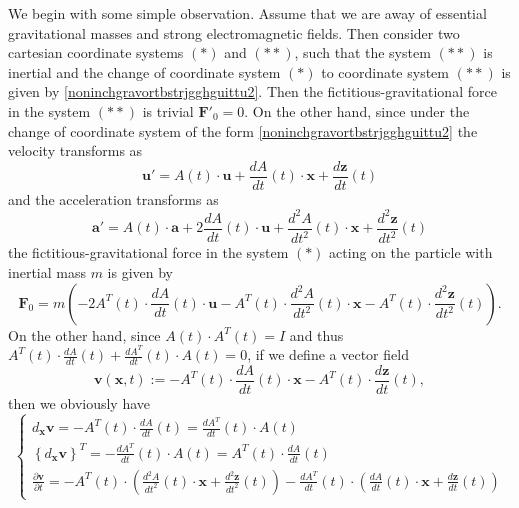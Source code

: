 \documentclass{article}
\theoremstyle{definition}
\theoremstyle{remark}
\renewcommand{\vec}[1]{\mathbf{#1}}
\newcommand{\er}{\eqref}
\newcommand{\er}{\eqref}
\begin{document}
 We begin with some simple observation. Assume that we are away of
essential gravitational masses and strong electromagnetic fields.
Then consider two cartesian coordinate systems $(*)$ and $(**)$,
such that the system $(**)$ is inertial and the change of coordinate
system $(*)$ to coordinate system $(**)$ is given by
\er{noninchgravortbstrjgghguittu2}. Then the
fictitious-gravitational force in the system $(**)$ is trivial $\vec
F'_0=0$. On the other hand, since under the change of coordinate
system of the form \er{noninchgravortbstrjgghguittu2} the velocity
transforms as
\begin{equation}\label{noninchgravortbstrjgghguittu2gjg}
\vec u'=A(t)\cdot\vec u+\frac{dA}{dt}(t)\cdot\vec x+\frac{d\vec
z}{dt}(t)
\end{equation}
and the acceleration
transforms as
\begin{equation}\label{noninchgravortbstrjgghguittu2gjgghhjhg}
\vec a'=A(t)\cdot\vec a+2\frac{dA}{dt}(t)\cdot\vec
u+\frac{d^2A}{dt^2}(t)\cdot\vec x+\frac{d^2\vec z}{dt^2}(t)
\end{equation}
the fictitious-gravitational force in the system $(*)$ acting on the
particle with inertial mass $m$ is given by
\begin{equation}\label{noninchgravortbstrjgghguittu2gjgghhjhghjhjgg}
\vec F_0=m\left(-2A^T(t)\cdot\frac{dA}{dt}(t)\cdot\vec
u-A^T(t)\cdot\frac{d^2 A}{dt^2}(t)\cdot\vec
x-A^T(t)\cdot\frac{d^2\vec z}{dt^2}(t)\right).
\end{equation}
On the other hand, since $A(t)\cdot A^T(t)=I$ and thus
$A^T(t)\cdot\frac{dA}{dt}(t)+\frac{dA^T}{dt}(t)\cdot A(t)=0$, if we
define a vector field
\begin{equation}\label{noninchgravortbstrjgghguittu2gjgjhjhhklk}
\vec v(\vec x,t):=-A^T(t)\cdot\frac{dA}{dt}(t)\cdot\vec
x-A^T(t)\cdot\frac{d\vec z}{dt}(t),
\end{equation}
then we obviously have
\begin{equation}\label{noninchgravortbstrjgghguittu2gjgjhjhhklkhgffgfg}
\begin{cases}
d_{\vec x}\vec
v=-A^T(t)\cdot\frac{dA}{dt}(t)=\frac{dA^T}{dt}(t)\cdot
A(t)
\\
\left\{d_{\vec x}\vec v\right\}^T=-\frac{dA^T}{dt}(t)\cdot
A(t)=A^T(t)\cdot\frac{dA}{dt}(t)
\\
\frac{\partial\vec v}{\partial
t}=-A^T(t)\cdot\left(\frac{d^2A}{dt^2}(t)\cdot\vec x+\frac{d^2\vec
z}{dt^2}(t)\right)-\frac{dA^T}{dt}(t)\cdot\left(\frac{dA}{dt}(t)\cdot\vec
x+\frac{d\vec z}{dt}(t)\right)
\end{cases}
\end{equation}
\end{document}
